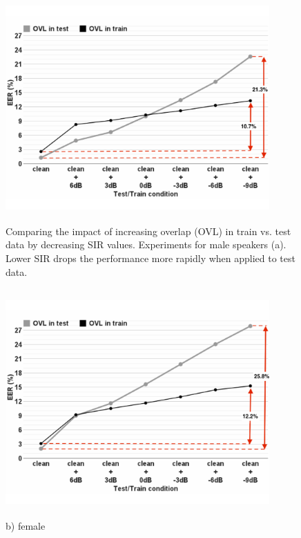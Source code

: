 \begin{figure}[t!]
	\includegraphics[height = 3.43in, width=0.9\textwidth]{figures/sidingrid_ovlintrainvstest_male_rev1}
	\caption{Comparing the impact of increasing overlap (OVL) in train vs. test data by decreasing SIR values. Experiments for male speakers (a). Lower SIR drops the performance more rapidly when applied to test data.}
	\label{fig:sidingrid_ovlintrainvstest_male}
\end{figure}

\begin{figure}[h!]
	\includegraphics[height = 3.43in, width=0.9\textwidth]{figures/sidingrid_ovlintrainvstest_female_rev1}
	\caption{b) female}
	\label{fig:sidingrid_ovlintrainvstest_female}
\end{figure}


